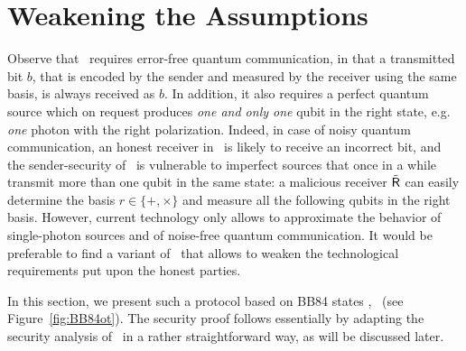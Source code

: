 

\section{Weakening the Assumptions}\label{sec:weakass}
Observe that \qot\ requires error-free quantum communication, in that
a transmitted bit $b$, that is encoded by the sender and measured by
the receiver using the same basis, is always received as $b$. In
addition, it also requires a perfect quantum source which on request
produces {\em one and only one} qubit in the right state, e.g.\ {\em
  one} photon with the right polarization.  Indeed, in case of noisy
quantum communication, an honest receiver in \qot\ is likely to
receive an incorrect bit, and the sender-security of \qot\ is
vulnerable to imperfect sources that once in a while transmit more
than one qubit in the same state: a malicious receiver $\tilde{\sf R}$ can
easily determine the basis $r \in \{+,\times \}$ and measure all the
following qubits in the right basis.  However, current technology only
allows to approximate the behavior of single-photon sources and of
noise-free quantum communication. It would be preferable to find a
variant of \qot\ that allows to weaken the technological requirements
put upon the honest parties. 
 

In this section, we present such a protocol based on BB84 states
\cite{BB84}, \BBqot\ (see Figure~\ref{fig:BB84ot}). The security proof
follows essentially by adapting the security analysis of \qot\ in a
rather straightforward way, as will be discussed later.

